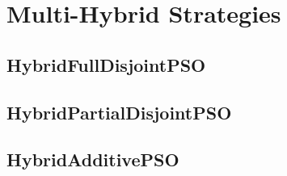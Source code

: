 {%









\section{Multi-Hybrid Strategies}\label{sec:hybrid}

\subsection*{HybridFullDisjointPSO}
\subsection*{HybridPartialDisjointPSO}
\subsection*{HybridAdditivePSO}


}